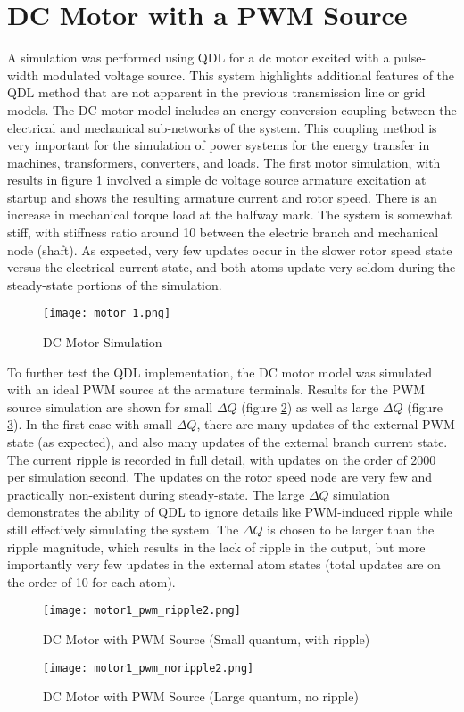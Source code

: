 \section{DC Motor with a PWM Source}

A simulation was performed using QDL for a dc motor excited with a pulse-width modulated voltage source. This system highlights additional features of the QDL method that are not apparent in the previous transmission line or grid models. The DC motor model includes an energy-conversion coupling between the electrical and mechanical sub-networks of the system. This coupling method is very important for the simulation of power systems for the energy transfer in machines, transformers, converters, and loads. The first motor simulation, with results in figure \ref{fig:motor_1} involved a simple dc voltage source armature excitation at startup and shows the resulting armature current and rotor speed. There is an increase in mechanical torque load at the halfway mark. The system is somewhat stiff, with stiffness ratio around 10 between the electric branch and mechanical node (shaft). As expected, very few updates occur in the slower rotor speed state versus the electrical current state, and both atoms update very seldom during the steady-state portions of the simulation. 

\begin{figure}[ht]
    \label{fig:motor_1}
    \centering
    \texttt{[image: motor\_1.png]}
    \caption{DC Motor Simulation}
\end{figure}  

To further test the QDL implementation, the DC motor model was simulated with an ideal PWM source at the armature terminals. Results for the PWM source simulation are shown for small $\Delta Q$ (figure \ref{fig:motor1_pwm_ripple}) as well as large $\Delta Q$ (figure \ref{fig:motor1_pwm_noripple}). In the first case with small $\Delta Q$, there are many updates of the external PWM state (as expected), and also many updates of the external branch current state. The current ripple is recorded in full detail, with updates on the order of 2000 per simulation second. The updates on the rotor speed node are very few and practically non-existent during steady-state. The large $\Delta Q$ simulation demonstrates the ability of QDL to ignore details like PWM-induced ripple while still effectively simulating the system. The $\Delta Q$ is chosen to be larger than the ripple magnitude, which results in the lack of ripple in the output, but more importantly very few updates in the external atom states (total updates are on the order of 10 for each atom).

\begin{figure}[ht]
    \label{fig:motor1_pwm_ripple}
    \centering
    \texttt{[image: motor1\_pwm\_ripple2.png]}
    \caption{DC Motor with PWM Source (Small quantum, with ripple)}
\end{figure}  

\begin{figure}[ht]
    \label{fig:motor1_pwm_noripple}
    \centering
    \texttt{[image: motor1\_pwm\_noripple2.png]}
    \caption{DC Motor with PWM Source (Large quantum, no ripple)}
\end{figure}  